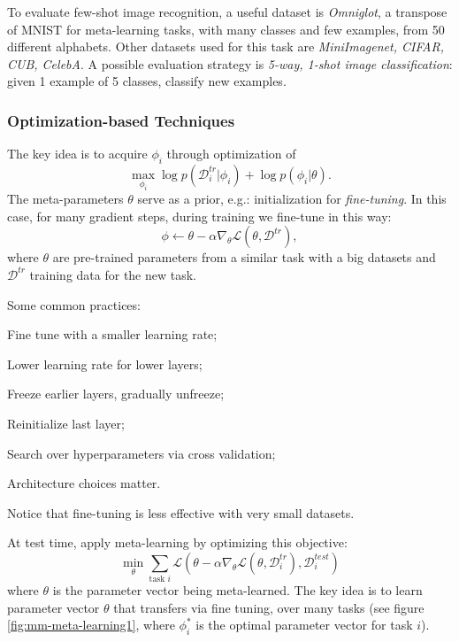 To evaluate few-shot image recognition, a useful dataset is \textit{Omniglot}, a transpose of MNIST for meta-learning tasks, with many classes and few examples, from 50 different alphabets. Other datasets used for this task are \textit{MiniImagenet, CIFAR, CUB, CelebA}. A possible evaluation strategy is \textit{5-way, 1-shot image classification}: given 1 example of 5 classes, classify new examples.


\subsubsection{Optimization-based Techniques}\label{sec:mm-optimization}

The key idea is to acquire $\phi_i$ through optimization of
\begin{equation}\label{eq:meta-learn-optimization}
    \max_{\phi_i} \log p(\mathcal{D}_i^{tr} | \phi_i) + \log p(\phi_i | \theta).
\end{equation}
The meta-parameters $\theta$ serve as a prior, e.g.: initialization for \textit{fine-tuning}. In this case, for many gradient steps, during training we fine-tune in this way:
\begin{equation}\label{eq:meta-learn-fine-tuning}
    \phi \gets \theta - \alpha \nabla_\theta \mathcal{L}(\theta, \mathcal{D}^{tr}),
\end{equation}
where $\theta$ are pre-trained parameters from a similar task with a big datasets and $\mathcal{D}^{tr}$ training data for the new task.

Some common practices:
\begin{myitem}
    \item Fine tune with a smaller learning rate;
    \item Lower learning rate for lower layers;
    \item Freeze earlier layers, gradually unfreeze;
    \item Reinitialize last layer;
    \item Search over hyperparameters via cross validation;
    \item Architecture choices matter.
\end{myitem}
Notice that fine-tuning is less effective with very small datasets.

At test time, apply meta-learning by optimizing this objective:
\begin{equation}\label{eq:meta-learn-objective}
    \min_\theta \sum_{\text{task } i} \mathcal{L} \left( \theta - \alpha \nabla_\theta \mathcal{L}(\theta, \mathcal{D}_i^{tr}), \mathcal{D}_i^{test} \right)
\end{equation}
where $\theta$ is the parameter vector being meta-learned.
The key idea is to learn parameter vector $\theta$ that transfers via fine tuning, over many tasks (see figure \ref{fig:mm-meta-learning1}, where $\phi_i^*$ is the optimal parameter vector for task $i$).

